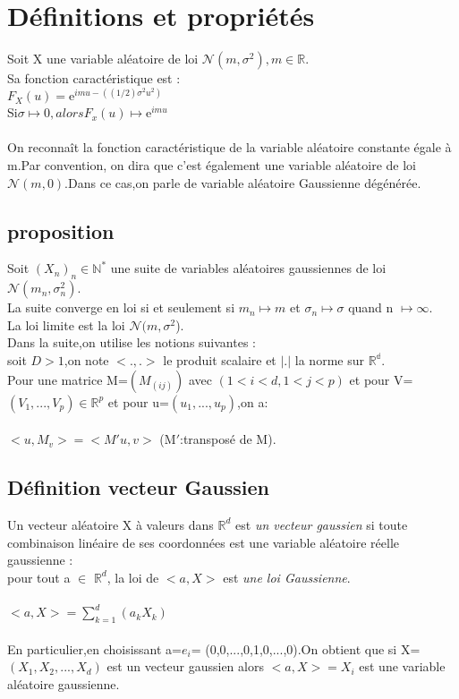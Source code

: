 \documentclass{book}
\begin{document}
   \date{02/03/2025}
   \tableofcontents
   \newpage
	
	\chapter{Définitions et propriétés}
	  
	   Soit X une variable aléatoire de loi $\mathcal{N}(m,\sigma^2),m \in\mathbb{R}$.\\Sa fonction caractéristique est :\\$F_X(u)=$$\mathrm{e}^{imu - ((1/2)\sigma^2 u^2)}$\\Si$ \sigma \mapsto 0, alorsF_x(u)\mapsto \mathrm{e}^{imu}$\\\\On reconnaît la fonction caractéristique  de la variable aléatoire constante égale à m.Par convention, on dira que c'est également une variable aléatoire de loi $\mathcal{N}(m,0)$.Dans ce cas,on parle de variable aléatoire Gaussienne dégénérée.
	 
	\section{proposition} 
		
		   Soit $(X_n)_n\in\mathbb{N}^*$  une suite de variables aléatoires  gaussiennes de loi $\mathcal{N}(m_n,\sigma^2_n)$.\\ La suite converge en loi si et seulement si $m_n\mapsto m$ et $\sigma_n\mapsto\sigma$ quand n $\mapsto\infty$.\\
		La loi limite est la loi $\mathcal{N}(m,\sigma^2$).\\Dans la suite,on utilise les notions suivantes :\\soit $D>1$,on note $<.,.>$ le produit scalaire et $|.|$ la norme sur $\mathbb{R^d}$.\\Pour une matrice M=$(M_(ij))$ avec $(1<i<d,1<j<p)$ et pour V=${(V_1,...,V_p)} \in \mathbb{R}^p$ et pour u={$(u_1,...,u_p)$},on a:\\\\ $<u, M_v> = <M\prime u, v>$ (M$\prime$:transposé de M).
		\section{Définition vecteur Gaussien}
		Un vecteur aléatoire X à valeurs dans $\mathbb{R}^d$ est \emph{un vecteur gaussien} si toute combinaison linéaire de ses coordonnées est une variable aléatoire réelle gaussienne :\\pour tout a $\in$ $\mathbb{R}^d$, la loi de $<a,X>$ est \emph{une loi Gaussienne}.\\\\$<a,X >=\sum_{k=1}^{d}(a_k X_k)$\\\\En particulier,en choisissant a=$e_i$= (0,0,...,0,1,0,...,0).On obtient que si X=$(X_1,X_2,...,X_d)$ est un vecteur gaussien alors $<a,X>=X_i$ est une variable aléatoire gaussienne.
		
\end{document}
